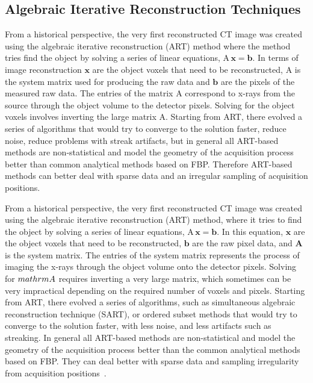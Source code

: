 \subsection{Algebraic Iterative Reconstruction Techniques}
From a historical perspective, the very first reconstructed CT image was created using the algebraic iterative reconstruction (ART) method where the method tries find the object by solving a series of linear equations, $\mathrm{A\,\mathbf{x} = \mathbf{b}}$.  In terms of image reconstruction $\mathrm{\mathbf{x}}$ are the object voxels that need to be reconstructed, $\mathrm{A}$ is the system matrix used for producing the raw data and $\mathrm{\mathbf{b}}$ are the pixels of the measured raw data.  The entries of the matrix $\mathrm{A}$ correspond to x-rays from the source through the object volume to the detector pixels.  Solving for the object voxels involves inverting the large matrix A.  Starting from ART, there evolved a series of algorithms that would try to converge to the solution faster, reduce noise, reduce problems with streak artifacts, but in general all ART-based methods are non-statistical and model the geometry of the acquisition process better than common analytical methods based on FBP.  Therefore ART-based methods can better deal with sparse data and an irregular sampling of acquisition positions\citep{Beister2012}.

From a historical perspective, the very first reconstructed CT image was created using the algebraic iterative reconstruction (ART) method, where it tries to find the object by solving a series of linear equations, $\mathrm{A\,\mathbf{x} = \mathbf{b}}$.  In this equation, $\mathrm{\mathbf{x}}$ are the object voxels that need to be reconstructed, $\mathrm{\mathbf{b}}$ are the raw pixel data, and $\mathrm{\mathbf{A}}$ is the system matrix.  The entries of the system matrix represents the process of imaging the x-rays through the object volume onto the detector pixels.  Solving for $\\mathrm{A}$ requires inverting a very large matrix, which sometimes can be very impractical depending on the required number of voxels and pixels.  Starting from ART, there evolved a series of algorithms, such as simultaneous algebraic reconstruction technique (SART), or ordered subset methods that would try to converge to the solution faster, with less noise, and less artifacts such as streaking.  In general all ART-based methods are non-statistical and model the geometry of the acquisition process better than the common analytical methods based on FBP.  They can deal better with sparse data and sampling irregularity from acquisition positions~\citep{Beister2012}.

